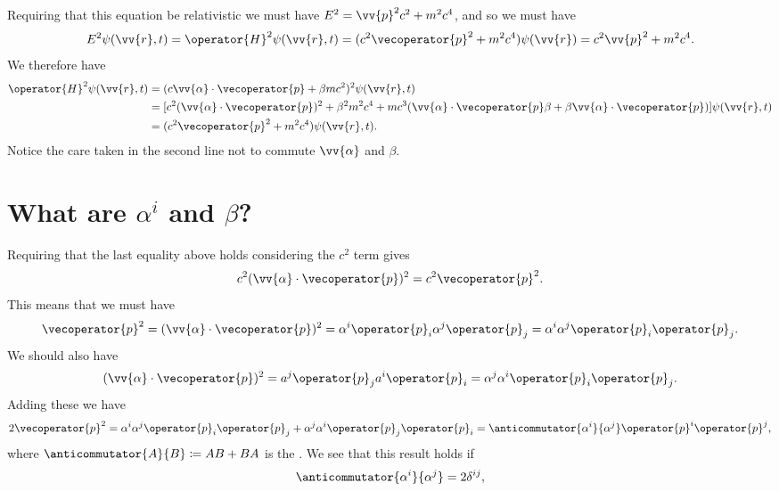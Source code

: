 \documentclass[fleqn]{NotesClass}
\newcommand*{\hamiltonian}{H}
\begin{document}
    Requiring that this equation be relativistic we must have \(E^2 = \vv{p}^2c^2 + m^2c^4\), and so we must have
    \begin{equation}
        E^2\psi(\vv{r}, t) = \operator{\hamiltonian}^2\psi(\vv{r}, t) = (c^2\vecoperator{p}^2 + m^2c^4)\psi(\vv{r}) = c^2\vv{p}^2 + m^2c^4.
    \end{equation}
    We therefore have
    \begin{align}
        \operator{\hamiltonian}^2\psi(\vv{r}, t) &= (c\vv{\alpha} \cdot \vecoperator{p} + \beta mc^2)^2 \psi(\vv{r}, t)\\
        &= [c^2(\vv{\alpha} \cdot \vecoperator{p})^2 + \beta^2m^2c^4 + mc^3(\vv{\alpha}\cdot\vecoperator{p}\beta + \beta\vv{\alpha}\cdot\vecoperator{p})] \psi(\vv{r}, t)\\
        &= (c^2\vecoperator{p}^2 + m^2c^4)\psi(\vv{r}, t).
    \end{align}
    Notice the care taken in the second line not to commute \(\vv{\alpha}\) and \(\beta\).
    
    \section{What are \texorpdfstring{\lowercase{\(\alpha^i\)}}{alpha^i} and \texorpdfstring{\(\beta\)}{beta}?}
    Requiring that the last equality above holds considering the \(c^2\) term gives
    \begin{equation}
        c^2(\vv{\alpha} \cdot \vecoperator{p})^2 = c^2\vecoperator{p}^2.
    \end{equation}
    This means that we must have
    \begin{equation}
        \vecoperator{p}^2 = (\vv{\alpha} \cdot \vecoperator{p})^2 = \alpha^i\operator{p}_i\alpha^j\operator{p}_j = \alpha^i\alpha^j\operator{p}_i\operator{p}_j.
    \end{equation}
    We should also have
    \begin{equation}
        (\vv{\alpha} \cdot \vecoperator{p})^2 = a^j\operator{p}_ja^i\operator{p}_i = \alpha^j\alpha^i\operator{p}_i\operator{p}_j.
    \end{equation}
    Adding these we have
    \begin{equation}
        2\vecoperator{p}^2 = \alpha^i\alpha^j\operator{p}_i\operator{p}_j + \alpha^j\alpha^i\operator{p}_j\operator{p}_i = \anticommutator{\alpha^i}{\alpha^j}\operator{p}^i\operator{p}^j,
    \end{equation}
    where \(\anticommutator{A}{B} \coloneqq AB + BA\) is the .
    We see that this result holds if
    \begin{equation}
        \anticommutator{\alpha^i}{\alpha^j} = 2\delta^{ij},
    \end{equation}
    
\end{document}

